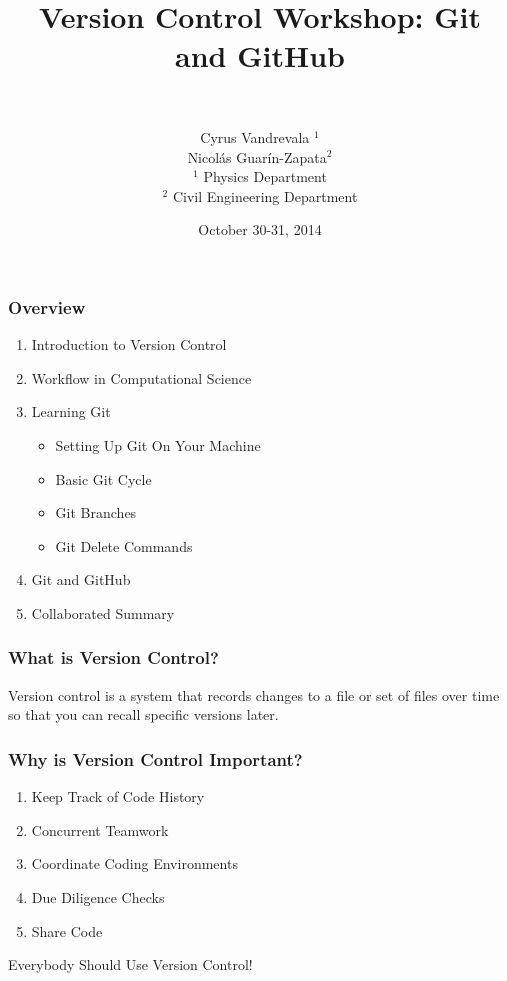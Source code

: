 


\title{Version Control Workshop: Git and GitHub}
\subtitle{~}
\author[AUTHOR]{\scriptsize{Cyrus Vandrevala $^1$\\Nicol\'as Guar\'in-Zapata$^2$}\\
\tiny{$^1$ Physics Department\\ $^2$ Civil Engineering Department}}
\date{October 30-31, 2014}




\begin{frame}[plain]
  \titlepage
\end{frame}

\begin{frame}
\frametitle{\large{Overview}}
\begin{enumerate}
\item Introduction to Version Control
\item Workflow in Computational Science
\item Learning Git
\begin{itemize}
\item Setting Up Git On Your Machine
\item Basic Git Cycle
\item Git Branches
\item Git Delete Commands
\end{itemize}
\item Git and GitHub
\item Collaborated Summary
\end{enumerate}
\end{frame}


\begin{frame}
\frametitle{\large{What is Version Control?}}
Version control is a system that records changes to a file or set of files over time so that you can recall specific versions later.
\end{frame}

\begin{frame}
\frametitle{\large{Why is Version Control Important?}}
\begin{enumerate}
\item Keep Track of Code History
\pause
\item Concurrent Teamwork
\pause
\item Coordinate Coding Environments
\pause
\item Due Diligence Checks
\pause
\item Share Code
\end{enumerate}
\pause
\vspace{5mm}
Everybody Should Use Version Control!
\end{frame}

